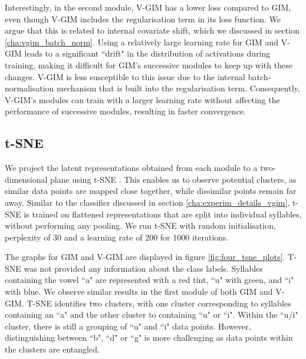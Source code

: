 		Interestingly, in the second module, V-GIM has a lower loss compared to GIM, even though V-GIM includes the regularisation term in its loss function. We argue that this is related to internal covariate shift, which we discussed in section \ref{cha:vgim_batch_norm}. Using a relatively large learning rate for GIM and V-GIM leads to a significant ``drift" in the distribution of activations during training, making it difficult for GIM's successive modules to keep up with these changes. V-GIM is less susceptible to this issue due to the internal batch-normalisation mechanism that is built into the regularisation term. Consequently, V-GIM's modules can train with a larger learning rate without affecting the performance of successive modules, resulting in faster convergence. %
		
		
		  



		
	\subsection{t-SNE} %
	We project the latent representations obtained from each module to a two-dimensional plane using t-SNE \cite{maatenVisualizingDataUsing2008}. This enables us to observe potential clusters, as similar data points are mapped close together, while dissimilar points remain far away. Similar to the classifier discussed in section \ref{cha:experim_details_vgim}, t-SNE is trained on flattened representations that are split into individual syllables, without performing any pooling. We run t-SNE with random initialisation, perplexity of 30 and a learning rate of 200 for 1000 iterations.
	
	The graphs for GIM and V-GIM are displayed in figure \ref{fig:four_tsne_plots}. T-SNE was not provided any information about the class labels. Syllables containing the vowel ``a" are represented with a red tint, ``u" with green, and ``i" with blue. We observe similar results in the first module of both GIM and V-GIM. T-SNE identifies two clusters, with one cluster corresponding to syllables containing an ``a" and the other cluster to containing ``u" or ``i". Within the ``u/i" cluster, there is still a grouping of ``u" and ``i" data points. However, distinguishing between ``b", ``d" or ``g" is more challenging as data points within the clusters are entangled.
	
